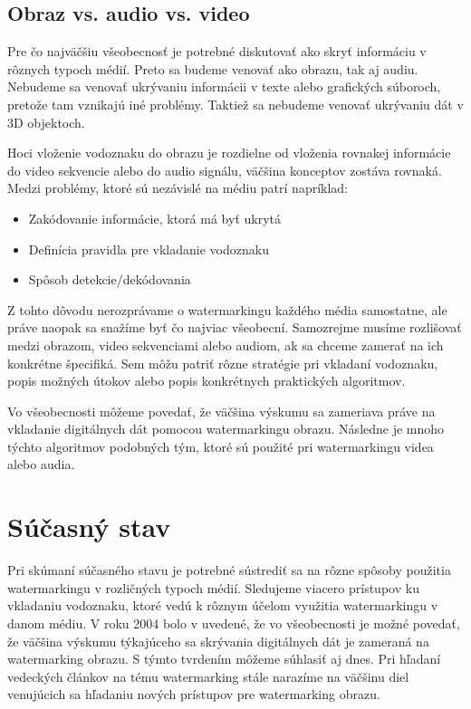 \section{Obraz vs. audio vs. video}
Pre čo najväčšiu všeobecnosť je potrebné diskutovať ako skryť informáciu v rôznych typoch médií. Preto sa budeme venovať ako obrazu, tak aj audiu. Nebudeme sa venovať ukrývaniu informácii v texte alebo grafických súboroch, pretože tam vznikajú iné problémy. Taktiež sa nebudeme venovať ukrývaniu dát v 3D objektoch.

Hoci vloženie vodoznaku do obrazu je rozdielne od vloženia rovnakej informácie do video sekvencie alebo do audio signálu, väčšina konceptov zostáva rovnaká. Medzi problémy, ktoré sú nezávislé na médiu patrí napríklad:

\begin{itemize}
\item Zakódovanie informácie, ktorá má byť ukrytá
\item Definícia pravidla pre vkladanie vodoznaku
\item Spôsob detekcie/dekódovania
\end{itemize}

Z tohto dôvodu nerozprávame o watermarkingu každého média samostatne, ale práve naopak sa snažíme byť čo najviac všeobecní. Samozrejme musíme rozlišovať medzi obrazom, video sekvenciami alebo audiom, ak sa chceme zamerať na ich konkrétne špecifiká. Sem môžu patriť rôzne stratégie pri vkladaní vodoznaku, popis možných útokov alebo popis konkrétnych praktických algoritmov.

Vo všeobecnosti môžeme povedať, že väčšina výskumu sa zameriava práve na vkladanie digitálnych dát pomocou watermarkingu obrazu. Následne je mnoho týchto algoritmov podobných tým, ktoré sú použité pri watermarkingu videa alebo audia. \cite{Barni}


\chapter{Súčasný stav}
Pri skúmaní súčasného stavu je potrebné sústrediť sa na rôzne spôsoby použitia watermarkingu v rozličných typoch médií. Sledujeme viacero prístupov ku vkladaniu vodoznaku, ktoré vedú k rôznym účelom využitia watermarkingu v danom médiu. V roku 2004 bolo v \cite{Barni} uvedené, že vo všeobecnosti je možné povedať, že väčšina výskumu týkajúceho sa skrývania digitálnych dát je zameraná na watermarking obrazu. S týmto tvrdením môžeme súhlasiť aj dnes. Pri hľadaní vedeckých článkov na tému watermarking stále narazíme na väčšinu diel venujúcich sa hľadaniu nových prístupov pre watermarking obrazu.

